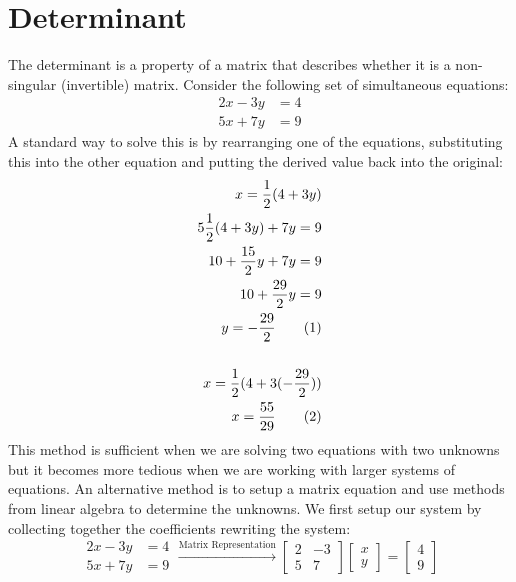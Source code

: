 \documentclass[a4paper,12pt]{article}
\newcommand{\nexteq}{\refstepcounter{equation}\theequation}
\begin{document}
	\section{Determinant}
	The determinant is a property of a matrix that describes whether it is a non-singular (invertible) matrix. Consider the following set of simultaneous equations: 
	\begin{align}
		2x - 3y &= 4 \\
		5x + 7y &= 9
	\end{align}	
	A standard way to solve this is by rearranging one of the equations, substituting this into the other equation and putting the derived value back into the original:	
	\begin{align*}
		x = \frac{1}{2} (4 + 3y) \\
		5\frac{1}{2}(4 + 3y) + 7y = 9 \\
		10 + \frac{15}{2} y + 7y = 9 \\
		10 + \frac{29}{2} y = 9 \\
		y = - \frac{29}{2} \tag{\nexteq} \\ 
		\\
		x = \frac{1}{2}(4 + 3(- \frac{29}{2})) \\
		x = \frac{55}{29} \tag{\nexteq}
	\end{align*}
	This method is sufficient when we are solving two equations with two unknowns but it becomes more tedious when we are working with larger systems of equations. An alternative method is to setup a matrix equation and use methods from linear algebra to determine the unknowns. We first setup our system by collecting together the coefficients rewriting the system: 
	\begin{equation}
		\begin{aligned}
			2x - 3y &= 4 \\
			5x + 7y &= 9
		\end{aligned}
		\xrightarrow{\text{Matrix Representation}}
		\begin{bmatrix}
			2 & -3 \\
			5 & 7 
		\end{bmatrix}
		\begin{bmatrix}
			x \\
			y
		\end{bmatrix}
		=
		\begin{bmatrix}
			4 \\
			9
		\end{bmatrix}
	\end{equation}
	
\end{document}

